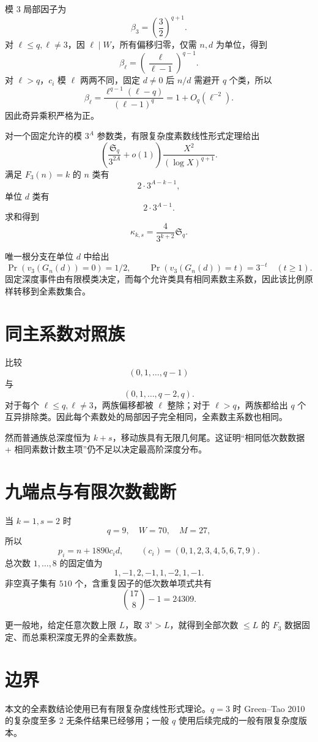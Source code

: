 \documentclass[11pt,a4paper]{ctexart}
\begin{document}
模 \(3\) 局部因子为
\[
\beta_3=\left(\frac32\right)^{q+1}.
\]
对 \(\ell\le q,\ell\ne3\)，因 \(\ell\mid W\)，所有偏移归零，仅需 \(n,d\) 为单位，得到
\[
\beta_\ell=\left(\frac{\ell}{\ell-1}\right)^{q-1}.
\]
对 \(\ell>q\)，\(c_i\) 模 \(\ell\) 两两不同，固定 \(d\ne0\) 后 \(n/d\) 需避开 \(q\) 个类，所以
\[
\beta_\ell=
\frac{\ell^{q-1}(\ell-q)}{(\ell-1)^q}
=
1+O_q(\ell^{-2}).
\]
因此奇异乘积严格为正。

对一个固定允许的模 \(3^A\) 参数类，有限复杂度素数线性形式定理给出
\[
\left(\frac{\mathfrak S_q}{3^{2A}}+o(1)\right)
\frac{X^2}{(\log X)^{q+1}}.
\]
满足 \(F_3(n)=k\) 的 \(n\) 类有
\[
2\cdot3^{A-k-1},
\]
单位 \(d\) 类有
\[
2\cdot3^{A-1}.
\]
求和得到
\[
\kappa_{k,s}=\frac4{3^{k+2}}\mathfrak S_q.
\]

唯一根分支在单位 \(d\) 中给出
\[
\Pr(v_3(G_n(d))=0)=1/2,
\qquad
\Pr(v_3(G_n(d))=t)=3^{-t}\quad(t\ge1).
\]
固定深度事件由有限模类决定，而每个允许类具有相同素数主系数，因此该比例原样转移到全素数集合。

\section{同主系数对照族}
比较
\[
(0,1,\ldots,q-1)
\]
与
\[
(0,1,\ldots,q-2,q).
\]
对于每个 \(\ell\le q,\ell\ne3\)，两族偏移都被 \(\ell\) 整除；对于 \(\ell>q\)，两族都给出 \(q\) 个互异排除类。因此每个素数处的局部因子完全相同，全素数主系数也相同。

然而普通族总深度恒为 \(k+s\)，移动族具有无限几何尾。这证明“相同低次数数据 + 相同素数计数主项”仍不足以决定最高阶深度分布。

\section{九端点与有限次数截断}
当 \(k=1,s=2\) 时
\[
q=9,\quad W=70,\quad M=27,
\]
所以
\[
p_i=n+1890c_i d,\qquad
(c_i)=(0,1,2,3,4,5,6,7,9).
\]
总次数 \(1,\ldots,8\) 的固定值为
\[
1,-1,2,-1,1,-2,1,-1.
\]
非空真子集有 \(510\) 个，含重复因子的低次数单项式共有
\[
\binom{17}{8}-1=24309.
\]

更一般地，给定任意次数上限 \(L\)，取 \(3^s>L\)，就得到全部次数 \(\le L\) 的 \(F_3\) 数据固定、而总乘积深度无界的全素数族。

\section{边界}
本文的全素数结论使用已有有限复杂度线性形式理论。\(q=3\) 时 Green--Tao 2010 的复杂度至多 \(2\) 无条件结果已经够用；一般 \(q\) 使用后续完成的一般有限复杂度版本。
\end{document}
